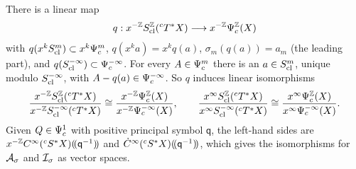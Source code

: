 \begin{proposition}
\label{cc:prop:quant}
There is a linear map
\[
 q:x^{-\mathbb Z}S_{\mathrm{cl}}^{\mathbb Z}({}^cT^*X)\longrightarrow x^{-\mathbb Z}\Psi_{c}^{\mathbb Z}(X)
\]
with \(q(x^kS_{\mathrm{cl}}^m)\subset x^k\Psi_{c}^m\), \(q(x^ka)=x^kq(a)\),
\(\sigma_m(q(a))=a_m\) (the leading part), and \(q(S_{\mathrm{cl}}^{-\infty})\subset
\Psi_{c}^{-\infty}\). For every \(A\in\Psi_{c}^m\) there is an \(a\in
S_{\mathrm{cl}}^m\), unique modulo \(S_{\mathrm{cl}}^{-\infty}\), with \(A-q(a)\in
\Psi_{c}^{-\infty}\). So \(q\) induces linear isomorphisms
\[
 \frac{x^{-\mathbb Z}S_{\mathrm{cl}}^{\mathbb Z}({}^cT^*X)}{x^{-\mathbb Z}S_{\mathrm{cl}}^{-\infty}({}^cT^*X)}
 \cong\frac{x^{-\mathbb Z}\Psi_{c}^{\mathbb Z}(X)}{x^{-\mathbb Z}\Psi_{c}^{-\infty}(X)},\qquad
 \frac{x^{\infty}S_{\mathrm{cl}}^{\mathbb Z}({}^cT^*X)}{x^{\infty}S_{\mathrm{cl}}^{-\infty}({}^cT^*X)}
 \cong\frac{x^{\infty}\Psi_{c}^{\mathbb Z}(X)}{x^\infty\Psi_{c}^{-\infty}(X)} .
\]
Given \(Q\in\Psi_{c}^1\) with positive principal symbol \(\mathsf q\), the
left-hand sides are \(x^{-\mathbb Z}C^\infty({}^cS^*X)(\!(\mathsf q^{-1})\!)\) and
\(\dot C^\infty({}^cS^*X)(\!(\mathsf q^{-1})\!)\), which gives the isomorphisms
\cite[(13)]{MN} for \(\mathcal A_\sigma\) and \(\mathcal I_\sigma\) as vector spaces.
\end{proposition}

